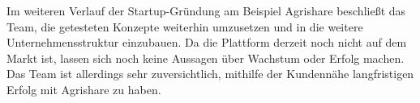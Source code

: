 Im weiteren Verlauf der Startup-Gründung am Beispiel Agrishare beschließt das Team, die getesteten Konzepte weiterhin umzusetzen und in die weitere Unternehmensstruktur einzubauen. Da die Plattform derzeit noch nicht auf dem Markt ist, lassen sich noch keine Aussagen über Wachstum oder Erfolg machen. Das Team ist allerdings sehr zuversichtlich, mithilfe der Kundennähe langfristigen Erfolg mit Agrishare zu haben.